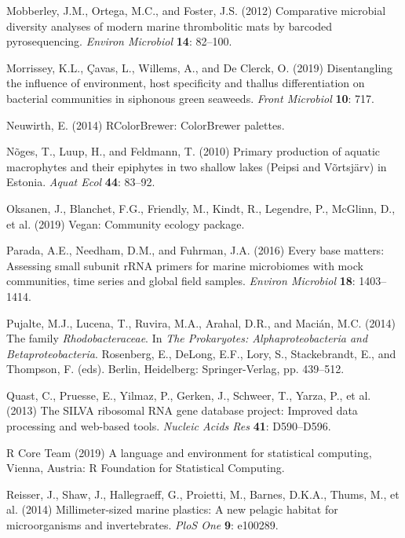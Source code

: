 \documentclass[12pt,]{article}
\begin{document}
\leavevmode\hypertarget{ref-Mobberley2012}{}%
Mobberley, J.M., Ortega, M.C., and Foster, J.S. (2012) Comparative
microbial diversity analyses of modern marine thrombolitic mats by
barcoded pyrosequencing. \emph{Environ Microbiol} \textbf{14}: 82--100.

\leavevmode\hypertarget{ref-Morrissey2019}{}%
Morrissey, K.L., Çavas, L., Willems, A., and De Clerck, O. (2019)
Disentangling the influence of environment, host specificity and thallus
differentiation on bacterial communities in siphonous green seaweeds.
\emph{Front Microbiol} \textbf{10}: 717.

\leavevmode\hypertarget{ref-Neuwirth2014}{}%
Neuwirth, E. (2014) RColorBrewer: ColorBrewer palettes.

\leavevmode\hypertarget{ref-Noges2010}{}%
Nõges, T., Luup, H., and Feldmann, T. (2010) Primary production of
aquatic macrophytes and their epiphytes in two shallow lakes (Peipsi and
Võrtsjärv) in Estonia. \emph{Aquat Ecol} \textbf{44}: 83--92.

\leavevmode\hypertarget{ref-Oksanen2019}{}%
Oksanen, J., Blanchet, F.G., Friendly, M., Kindt, R., Legendre, P.,
McGlinn, D., et al. (2019) Vegan: Community ecology package.

\leavevmode\hypertarget{ref-Parada2016}{}%
Parada, A.E., Needham, D.M., and Fuhrman, J.A. (2016) Every base
matters: Assessing small subunit rRNA primers for marine microbiomes
with mock communities, time series and global field samples.
\emph{Environ Microbiol} \textbf{18}: 1403--1414.

\leavevmode\hypertarget{ref-Pujalte2014}{}%
Pujalte, M.J., Lucena, T., Ruvira, M.A., Arahal, D.R., and Macián, M.C.
(2014) The family \emph{Rhodobacteraceae}. In \emph{The Prokaryotes:
Alphaproteobacteria and Betaproteobacteria}. Rosenberg, E., DeLong,
E.F., Lory, S., Stackebrandt, E., and Thompson, F. (eds). Berlin,
Heidelberg: Springer-Verlag, pp. 439--512.

\leavevmode\hypertarget{ref-Quast2013}{}%
Quast, C., Pruesse, E., Yilmaz, P., Gerken, J., Schweer, T., Yarza, P.,
et al. (2013) The SILVA ribosomal RNA gene database project: Improved
data processing and web-based tools. \emph{Nucleic Acids Res}
\textbf{41}: D590--D596.

\leavevmode\hypertarget{ref-RCoreTeam2019}{}%
R Core Team (2019) A language and environment for statistical computing,
Vienna, Austria: R Foundation for Statistical Computing.

\leavevmode\hypertarget{ref-Reisser2014}{}%
Reisser, J., Shaw, J., Hallegraeff, G., Proietti, M., Barnes, D.K.A.,
Thums, M., et al. (2014) Millimeter-sized marine plastics: A new pelagic
habitat for microorganisms and invertebrates. \emph{PloS One}
\textbf{9}: e100289.
\end{document}
